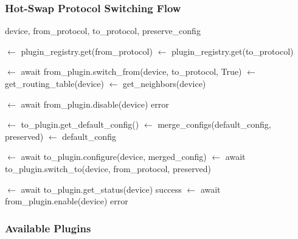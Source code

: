\documentclass[10pt,a4paper]{article}
\begin{document}
\subsubsection{Hot-Swap Protocol Switching Flow}

\begin{algorithm}
\caption{Protocol Hot-Swap Algorithm}
\begin{algorithmic}[H]
\REQUIRE device, from\_protocol, to\_protocol, preserve\_config

 $\leftarrow$ plugin\_registry.get(from\_protocol)
 $\leftarrow$ plugin\_registry.get(to\_protocol)

 \THEN
     $\leftarrow$ await from\_plugin.switch\_from(device, to\_protocol, True)
     $\leftarrow$ get\_routing\_table(device)
     $\leftarrow$ get\_neighbors(device)
\ENDIF

 $\leftarrow$ await from\_plugin.disable(device)
 \THEN
    \RETURN error
\ENDIF

 $\leftarrow$ to\_plugin.get\_default\_config()
 \THEN
     $\leftarrow$ merge\_configs(default\_config, preserved)
\ELSE
     $\leftarrow$ default\_config
\ENDIF

 $\leftarrow$ await to\_plugin.configure(device, merged\_config)
 $\leftarrow$ await to\_plugin.switch\_to(device, from\_protocol, preserved)

 $\leftarrow$ await to\_plugin.get\_status(device)
 \THEN
    \RETURN success
\ELSE
     $\leftarrow$ await from\_plugin.enable(device)
    \RETURN error
\ENDIF
\end{algorithmic}
\end{algorithm}

\subsubsection{Available Plugins}
\end{document}
